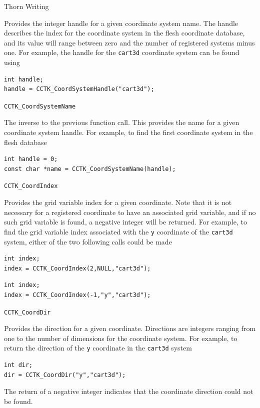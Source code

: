 \begin{cactuspart}{Thorn Writing}
\begin{Lentry}
Provides the integer handle for a given coordinate system name. The handle describes
the index for the coordinate system in the flesh coordinate database, and its value
will range between zero and the number of registered systems minus one. For example,
the handle for the \texttt{cart3d} coordinate system can be found using
%
\begin{verbatim}
int handle;
handle = CCTK_CoordSystemHandle("cart3d");
\end{verbatim}

\item[\texttt{CCTK\_CoordSystemName}]

The inverse to the previous function call. This provides the name for a given coordinate system handle.
For example, to find the first coordinate system in the flesh database
%
\begin{verbatim}
int handle = 0;
const char *name = CCTK_CoordSystemName(handle);
\end{verbatim}

\item[\texttt{CCTK\_CoordIndex}]

Provides the grid variable index for a given coordinate. Note that it is
not necessary for a registered coordinate to have an associated grid variable,
and if no such grid variable is found, a negative integer will be returned.
For example, to find the grid variable index associated with the \texttt{y}
coordinate of the \texttt{cart3d} system, either of the two following
calls could be made
%
\begin{verbatim}
int index;
index = CCTK_CoordIndex(2,NULL,"cart3d");
\end{verbatim}
%
\begin{verbatim}
int index;
index = CCTK_CoordIndex(-1,"y","cart3d");
\end{verbatim}


\item[\texttt{CCTK\_CoordDir}]

Provides the direction for a given coordinate. Directions are integers
ranging from one to the number of dimensions for the coordinate system.
For example, to return the direction of the \texttt{y} coordinate in
the \texttt{cart3d} system
%
\begin{verbatim}
int dir;
dir = CCTK_CoordDir("y","cart3d");
\end{verbatim}

The return of a negative integer indicates that the coordinate direction
could not be found.


\end{Lentry}
\end{cactuspart}
